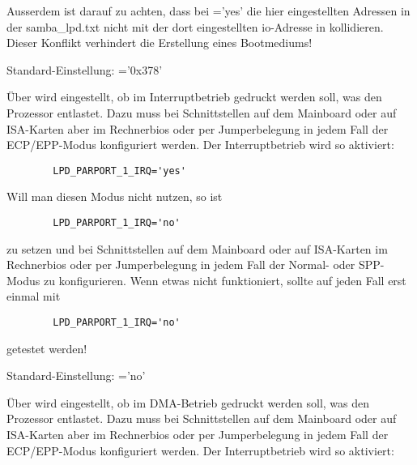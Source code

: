 \begin{description}
    Ausserdem ist darauf zu achten, dass bei ='yes' die hier
    eingestellten Adressen in der samba\_lpd.txt nicht mit der dort
    eingestellten io-Adresse in  kollidieren.
    Dieser Konflikt verhindert die Erstellung eines Bootmediums!

    Standard-Einstellung: ='0x378'



        {Über  wird eingestellt, ob im
        Interruptbetrieb gedruckt werden soll, was den Prozessor entlastet. Dazu
        muss bei Schnittstellen auf dem Mainboard oder auf ISA-Karten aber im
        Rechnerbios oder per Jumperbelegung in jedem Fall der ECP/EPP-Modus
        konfiguriert werden. Der Interruptbetrieb wird so aktiviert:

\begin{example}
\begin{verbatim}
        LPD_PARPORT_1_IRQ='yes'
\end{verbatim}
\end{example}

        Will man diesen Modus nicht nutzen, so ist

\begin{example}
\begin{verbatim}
        LPD_PARPORT_1_IRQ='no'
\end{verbatim}
\end{example}

        zu setzen und bei Schnittstellen auf dem Mainboard oder auf ISA-Karten
        im Rechnerbios oder per Jumperbelegung in jedem Fall der Normal- oder
        SPP-Modus zu konfigurieren.
        Wenn etwas nicht funktioniert, sollte auf jeden Fall erst einmal mit

\begin{example}
\begin{verbatim}
        LPD_PARPORT_1_IRQ='no'
\end{verbatim}
\end{example}

        getestet werden!

        Standard-Einstellung: ='no'}



        {Über  wird eingestellt, ob im
        DMA-Betrieb gedruckt werden soll, was den Prozessor entlastet. Dazu
        muss bei Schnittstellen auf dem Mainboard oder auf ISA-Karten aber im
        Rechnerbios oder per Jumperbelegung in jedem Fall der ECP/EPP-Modus
        konfiguriert werden. Der Interruptbetrieb wird so aktiviert:

}
\end{description}
